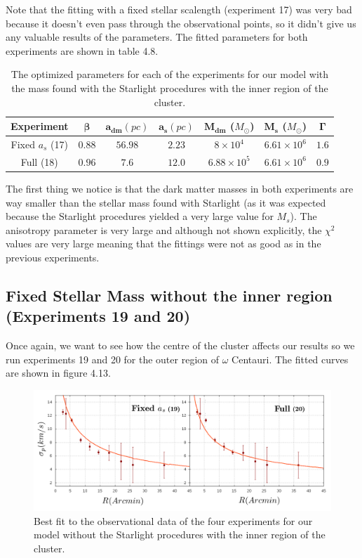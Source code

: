 Note that the fitting with a fixed stellar scalength (experiment 17) was very bad because it doesn't even pass through the observational points, so it didn't give us any valuable results of the parameters. The fitted parameters for both experiments are shown in table 4.8. 

\begin{table}[]
\centering
\begin{tabular}{| c| c| c| c| c| c| c|}
    \hline
    \textbf{Experiment} & $\mathbf{\beta}$ & $\mathbf{a_{dm}} (pc)$ & $\mathbf{a_{s}} (pc)$ & $\mathbf{M_{dm}}$ ($M_{\odot}$) & $\mathbf{M_{s}}$ ($M_{\odot}$) & $\mathbf{\Gamma}$\\ \hline
	Fixed $a_s$ (17) &	$0.88$ &	$56.98$ &	$2.23$ &	$8 \times 10^{4}$ &	$6.61 \times 10 ^{6}$ &	$1.6$\\ \hline
	Full (18) &	$0.96$ &	$7.6$ &	$12.0$ &	$6.88 \times 10^{5}$ &	$6.61 \times 10^{6}$ &	$0.9$\\ \hline
  \end{tabular} 
\caption[Optimized parameters for our model with the mass found with the Starlight procedures with the inner region.]{The optimized parameters for each of the experiments for our model with the mass found with the Starlight procedures with the inner region of the cluster.}
\end{table}

The first thing we notice is that the dark matter masses in both experiments are way smaller than the stellar mass found with Starlight (as it was expected because the Starlight procedures yielded a very large value for $M_s$). The anisotropy parameter is very large and although not shown explicitly, the $\chi^{2}$ values are very large meaning that the fittings were not as good as in the previous experiments.

\subsection{Fixed Stellar Mass without the inner region (Experiments 19 and 20)}

Once again, we want to see how the centre of the cluster affects our results so we run experiments 19 and 20 for the outer region of $\omega$ Centauri. The fitted curves are shown in figure 4.13. 

\begin{figure}[H]
\centering
\includegraphics[width=15cm]{images/Starlight_1.png}
\caption[Best fit of our model with the mass found with the Starlight procedures without the inner region]{Best fit to the observational data of the four experiments for our model without the Starlight procedures with the inner region of the cluster.}
\end{figure}

